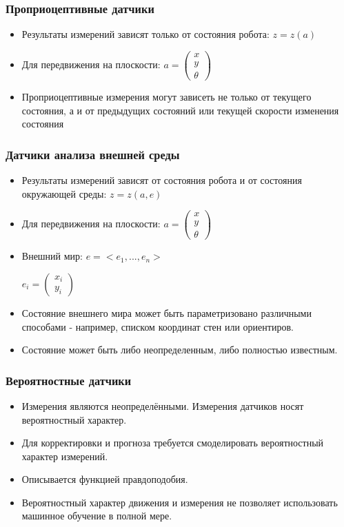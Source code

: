 \documentclass{article}
\begin{document}
\begin{sloppypar}
    \subsubsection{Проприоцептивные датчики}
    \begin{itemize}
        \item Результаты измерений зависят только от состояния робота: $z = z(a)$
        \item Для передвижения на плоскости: $a = \begin{pmatrix} x \\ y \\ \theta \end{pmatrix}$
        \item Проприоцептивные измерения могут зависеть не только от текущего состояния, а и от предыдущих состояний или текущей скорости изменения состояния
    \end{itemize}
    \subsubsection{Датчики анализа внешней среды}
    \begin{itemize}
        \item Результаты измерений зависят от состояния робота и от состояния окружающей
              среды:
              $z = z(a, e)$
        \item Для передвижения на плоскости:
              $𝑎 = \begin{pmatrix}x \\ y \\ \theta \end{pmatrix}$
        \item Внешний мир: $e = <e_1, ..., e_n>$

              $e_i = \begin{pmatrix}x_i \\ y_i\end{pmatrix}$
        \item Состояние внешнего мира может быть параметризовано различными способами -
              например, списком координат стен или ориентиров.
        \item Состояние может быть либо неопределенным, либо полностью известным.
    \end{itemize}

    \subsubsection{Вероятностные датчики}
    \begin{itemize}
        \item Измерения являются неопределёнными. Измерения датчиков носят вероятностный характер.
        \item Для корректировки и прогноза требуется смоделировать вероятностный характер измерений.
        \item Описывается функцией правдоподобия.
        \item Вероятностный характер движения и измерения не позволяет использовать машинное обучение в полной мере.
    \end{itemize}


\end{sloppypar}
\end{document}
